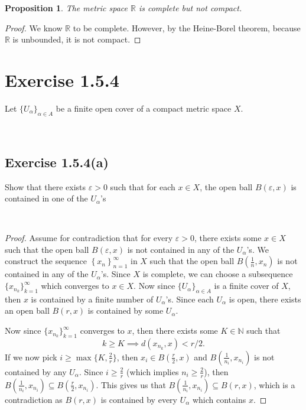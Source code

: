 \documentclass[12pt]{article}
\newcommand{\N}{\mathbb{N}}
\newcommand{\R}{\mathbb{R}}
\newcommand{\eps}{\varepsilon}
\newenvironment{problem}
    {\begin{lrbox}{\mybox}\begin{minipage}{\textwidth-10pt}}
    {\end{minipage}\end{lrbox}\framebox[6.5in]{\usebox{\mybox}}\\}
\newtheorem{proposition}{Proposition}
\newcommand{\seq}[1]{\left\{#1\right\}_{n=1}^\infty}
\begin{document}
\begin{proposition}
    The metric space $\R$ is complete but not compact.
\end{proposition}

\begin{proof}
    We know $\R$ to be complete. However, by the Heine-Borel theorem, because $\R$ is unbounded, it is not compact.
    
\end{proof}

\section*{Exercise 1.5.4}
\begin{problem}
    Let $\{U_\alpha\}_{\alpha\in A}$ be a finite open cover of a compact metric space $X$.
\end{problem}

\subsection*{Exercise 1.5.4(a)}
\begin{problem}
    Show that there exists $\eps>0$ such that for each $x\in X$, the open ball $B(\eps, x)$ is contained in one of the $U_\alpha$'s
\end{problem}

\begin{proof}
    Assume for contradiction that for every $\eps>0$, there exists some $x\in X$ such that the open ball $B(\eps, x)$ is not contained in any of the $U_\alpha$'s. We construct the sequence $\seq{x_n}$ in $X$ such that the open ball $B(\frac1n, x_n)$ is not contained in any of the $U_\alpha$'s. Since $X$ is complete, we can choose a subsequence $\{x_{n_k}\}_{k=1}^\infty$ which converges to $x\in X$. Now since $\{U_\alpha\}_{\alpha\in A}$ is a finite cover of $X$, then $x$ is contained by a finite number of $U_\alpha$'s. Since each $U_\alpha$ is open, there exists an open ball $B(r,x)$ is contained by some $U_\alpha$.
    
    Now since $\{x_{n_k}\}_{k=1}^\infty$ converges to $x$, then there exists some $K\in\N$ such that
    \[k\geq K \implies d(x_{n_k}, x) < r/2.\]
    If we now pick $i \geq \max\{K, \frac2r\}$, then $x_i\in B(\frac r2, x)$ and $B(\frac1{n_i}, x_{n_i})$ is not contained by any $U_\alpha$. Since $i\geq \frac2r$ (which implies $n_i \geq \frac2r$), then  $B(\frac1{n_i}, x_{n_i}) \subseteq B(\frac r2, x_{n_i})$. This gives us that $B(\frac1{n_i}, x_{n_i}) \subseteq B(r,x)$, which is a contradiction as $B(r,x)$ is contained by every $U_\alpha$ which contains $x$.
    
\end{proof}
\end{document}
